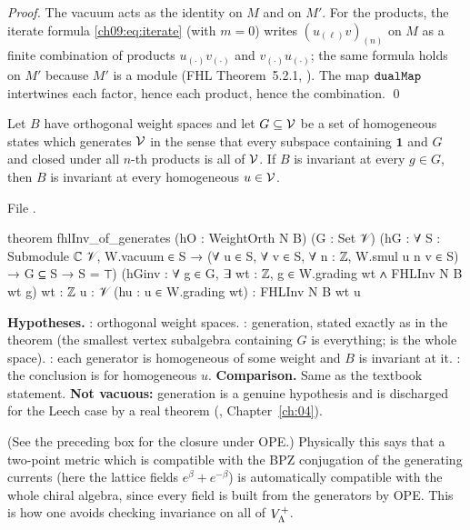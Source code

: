 \noindent\emph{Proof.} The vacuum acts as the identity on $M$ and on $M'$. For the products, the
iterate formula \eqref{ch09:eq:iterate} (with $m=0$) writes $(u_{(\ell)}v)_{(n)}$ on $M$ as a finite
combination of products $u_{(\cdot)}v_{(\cdot)}$ and $v_{(\cdot)}u_{(\cdot)}$; the same formula holds
on $M'$ because $M'$ is a module (FHL Theorem~5.2.1, ). The map
$\lean{dualMap}$ intertwines each factor, hence each product, hence the combination. \qed

\begin{theorem}\label{ch09:thm:generates}
Let $B$ have orthogonal weight spaces and let $G\subseteq\mathcal{V}$ be a set of homogeneous states
which generates $\mathcal{V}$ in the sense that every subspace containing $\mathbf 1$ and $G$ and
closed under all $n$-th products is all of $\mathcal{V}$. If $B$ is invariant at every $g\in G$, then
$B$ is invariant at every homogeneous $u\in\mathcal{V}$.
\end{theorem}
\noindent File .
\begin{leancode}
theorem fhlInv_of_generates (hO : WeightOrth N B) (G : Set 𝒱)
    (hG : ∀ S : Submodule ℂ 𝒱, W.vacuum ∈ S → (∀ u ∈ S, ∀ v ∈ S, ∀ n : ℤ, W.smul u n v ∈ S) →
      G ⊆ S → S = ⊤)
    (hGinv : ∀ g ∈ G, ∃ wt : ℤ, g ∈ W.grading wt ∧ FHLInv N B wt g)
    {wt : ℤ} {u : 𝒱} (hu : u ∈ W.grading wt) : FHLInv N B wt u
\end{leancode}
\begin{dictionary}
\textbf{Hypotheses.} : orthogonal weight spaces. : generation, stated exactly
as in the theorem (the smallest vertex subalgebra containing $G$ is everything;  is the
whole space). : each generator is homogeneous of some weight and $B$ is invariant at it.
: the conclusion is for homogeneous $u$. \textbf{Comparison.} Same as the textbook
statement. \textbf{Not vacuous:} generation is a genuine hypothesis and is discharged for the Leech
case by a real theorem (, Chapter~\ref{ch:04}).
\end{dictionary}
\begin{physics}
(See the preceding box for the closure under OPE.) Physically this says that a two-point metric which is compatible with the BPZ conjugation of the generating currents (here the lattice fields $e^\beta+e^{-\beta}$) is automatically compatible with the whole chiral algebra, since every field is built from the generators by OPE. This is how one avoids checking invariance on all of $V_{\Lambda}^{+}$.
\end{physics}

